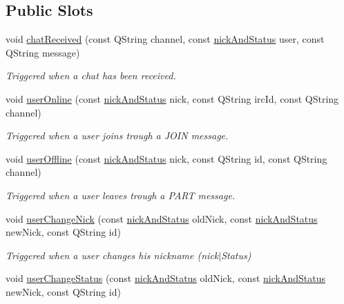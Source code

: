 \subsection*{Public Slots}
\begin{DoxyCompactItemize}
\item 
void \hyperlink{classserver_1_1main_app_a0970ee01d48b04ebc1390ffb8edecfc0}{chat\-Received} (const Q\-String channel, const \hyperlink{structserver_1_1nick_and_status}{nick\-And\-Status} user, const Q\-String message)
\begin{DoxyCompactList}\small\item\em Triggered when a chat has been received. \end{DoxyCompactList}\item 
void \hyperlink{classserver_1_1main_app_a92448c1219ad89999c983b04adaa4236}{user\-Online} (const \hyperlink{structserver_1_1nick_and_status}{nick\-And\-Status} nick, const Q\-String irc\-Id, const Q\-String channel)
\begin{DoxyCompactList}\small\item\em Triggered when a user joins trough a J\-O\-I\-N message. \end{DoxyCompactList}\item 
void \hyperlink{classserver_1_1main_app_aae86b15c001a235de78a90334e697b5f}{user\-Offline} (const \hyperlink{structserver_1_1nick_and_status}{nick\-And\-Status} nick, const Q\-String id, const Q\-String channel)
\begin{DoxyCompactList}\small\item\em Triggered when a user leaves trough a P\-A\-R\-T message. \end{DoxyCompactList}\item 
void \hyperlink{classserver_1_1main_app_ae15deb9260c486854af7fac7b063fdf5}{user\-Change\-Nick} (const \hyperlink{structserver_1_1nick_and_status}{nick\-And\-Status} old\-Nick, const \hyperlink{structserver_1_1nick_and_status}{nick\-And\-Status} new\-Nick, const Q\-String id)
\begin{DoxyCompactList}\small\item\em Triggered when a user changes his nickname (nick$|$\-Status) \end{DoxyCompactList}\item 
void \hyperlink{classserver_1_1main_app_aaa3dd74b510e2d797f21293a622a4f7d}{user\-Change\-Status} (const \hyperlink{structserver_1_1nick_and_status}{nick\-And\-Status} old\-Nick, const \hyperlink{structserver_1_1nick_and_status}{nick\-And\-Status} new\-Nick, const Q\-String id)

\end{DoxyCompactItemize}
